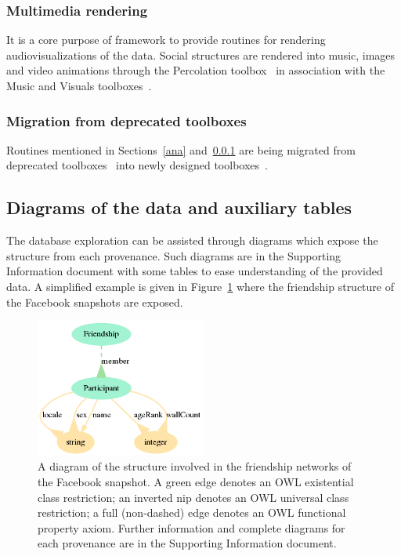 \documentclass[review]{elsarticle}
\begin{document}
\subsubsection{Multimedia rendering}\label{media}
It is a core purpose of framework to provide routines for rendering
audiovisualizations of the data.
Social structures are rendered into music, images and video animations
through the Percolation toolbox~\cite{percolation} in association with
the Music and Visuals toolboxes~\cite{music,visuals}.

\subsubsection{Migration from deprecated toolboxes}
Routines mentioned in Sections~\ref{ana} and~\ref{media} are being migrated from deprecated
toolboxes~\cite{gmaneLegacy,percolationLegacy} into newly designed
toolboxes~\cite{percolation,visuals}.

\subsection{Diagrams of the data and auxiliary tables}
The database exploration can be assisted through diagrams which expose
the structure from each provenance.
Such diagrams are in the Supporting Information document
with some tables to ease understanding of the provided data.
A simplified example is given in Figure~\ref{dia} where the friendship
structure of the Facebook snapshots are exposed.

\begin{figure}[!ht]
    \centering
    \includegraphics[width=0.5\textwidth]{ontologies/facebook-legacy-AntonioAnzoategui18022013Friendship.ttl/draw}
    \caption{A diagram of the structure involved in the friendship networks
    of the Facebook snapshot. A green edge denotes an OWL existential class restriction; an inverted nip denotes an OWL universal class restriction; a full (non-dashed) edge denotes an OWL functional property axiom. Further information and complete diagrams for each provenance are in the Supporting Information document.}\label{dia}
\end{figure}
\end{document}
